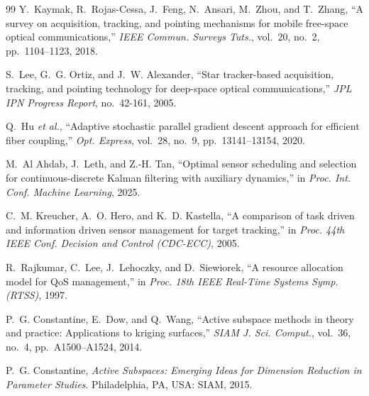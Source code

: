 \documentclass[letterpaper,onecolumn]{IEEEtran}
\theoremstyle{definition}
\theoremstyle{remark}
\begin{document}
\begin{thebibliography}{99}
 Y.~Kaymak, R.~Rojas-Cessa, J.~Feng, N.~Ansari, M.~Zhou,
and T.~Zhang, ``A survey on acquisition, tracking, and pointing mechanisms
for mobile free-space optical communications,'' \emph{IEEE Commun. Surveys
Tuts.}, vol.~20, no.~2, pp.~1104--1123, 2018.

 S.~Lee, G.~G. Ortiz, and J.~W. Alexander, ``Star
tracker-based acquisition, tracking, and pointing technology for deep-space
optical communications,'' \emph{JPL IPN Progress Report}, no.~42-161, 2005.

 Q.~Hu \emph{et al.}, ``Adaptive stochastic parallel
gradient descent approach for efficient fiber coupling,'' \emph{Opt.
Express}, vol.~28, no.~9, pp.~13141--13154, 2020.

 M.~Al Ahdab, J.~Leth, and Z.-H. Tan, ``Optimal sensor
scheduling and selection for continuous-discrete Kalman filtering with
auxiliary dynamics,'' in \emph{Proc. Int. Conf. Machine Learning}, 2025.

 C.~M. Kreucher, A.~O. Hero, and K.~D. Kastella, ``A
comparison of task driven and information driven sensor management for
target tracking,'' in \emph{Proc. 44th IEEE Conf. Decision and Control
(CDC-ECC)}, 2005. %

 R.~Rajkumar, C.~Lee, J.~Lehoczky, and D.~Siewiorek,
``A resource allocation model for QoS management,'' in \emph{Proc. 18th
IEEE Real-Time Systems Symp. (RTSS)}, 1997. %

 P.~G. Constantine, E.~Dow, and Q.~Wang, ``Active subspace
methods in theory and practice: Applications to kriging surfaces,''
\emph{SIAM J. Sci. Comput.}, vol.~36, no.~4, pp.~A1500--A1524, 2014.

 P.~G. Constantine, \emph{Active Subspaces: Emerging
Ideas for Dimension Reduction in Parameter Studies}. Philadelphia, PA, USA:
SIAM, 2015.

\end{thebibliography}
\end{document}
